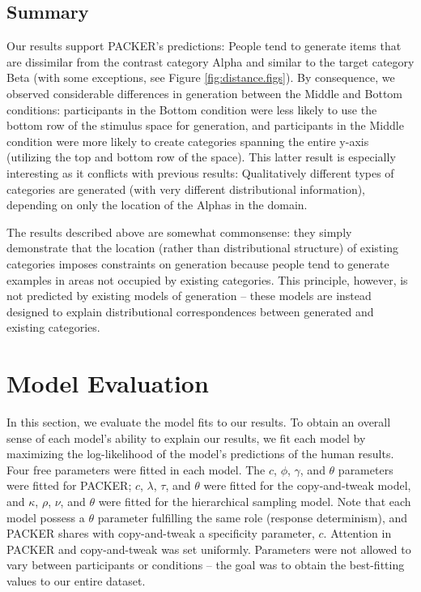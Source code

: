 \documentclass[10pt,letterpaper]{article}
\begin{document}
\subsection{Summary}
Our results support PACKER's predictions: People tend to generate items that are dissimilar from the contrast category Alpha and similar to the target category Beta (with some exceptions, see Figure \ref{fig:distance.figs}). By consequence, we observed considerable differences in generation between the Middle and Bottom conditions: participants in the Bottom condition were less likely to use the bottom row of the stimulus space for generation, and participants in the Middle condition were more likely to create categories spanning the entire y-axis (utilizing the top and bottom row of the space). This latter result is especially interesting as it conflicts with previous results: Qualitatively different types of categories are generated (with very different distributional information), depending on only the location of the Alphas in the domain. 

The results described above are somewhat commonsense: they simply demonstrate that the location (rather than distributional structure) of existing categories imposes constraints on generation because people tend to generate examples in areas not occupied by existing categories. This principle, however, is not predicted by existing models of generation -- these models are instead designed to explain distributional correspondences between generated and existing categories.  


\section{Model Evaluation}
In this section, we evaluate the model fits to our results. To obtain an overall sense of each model's ability to explain our results, we fit each model by maximizing the log-likelihood of the model's predictions of the human results. Four free parameters were fitted in each model. The $c$, $\phi$, $\gamma$, and $\theta$ parameters were fitted for PACKER; $c$, $\lambda$, $\tau$, and $\theta$ were fitted for the copy-and-tweak model, and $\kappa$, $\rho$, $\nu$, and $\theta$ were fitted for the hierarchical sampling model. Note that each model possess a $\theta$ parameter fulfilling the same role (response determinism), and PACKER shares with copy-and-tweak a specificity parameter, $c$. Attention in PACKER and copy-and-tweak was set uniformly. Parameters were not allowed to vary between participants or conditions -- the goal was to obtain the best-fitting values to our entire dataset.
\end{document}
